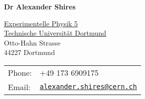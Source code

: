 \documentclass[10pt]{article}
\def\tud{Technische Universit\"at Dortmund}
\def\name{Dr Alexander Shires}
\providecommand*\email[1]{\href{mailto:#1}{#1}}
\renewcommand*\email[1]{\href{mailto:#1}{\texttt{#1}}}
\begin{document}
\centerline{\Large \bf \name}

\vspace{0.25cm}

\begin{minipage}{0.50\linewidth}
  \href{http://www.e5.physik.uni-dortmund.de}{Experimentelle Physik 5} \\
  \href{http://www.uni-dortmund.de}{\tud} \\
  Otto-Hahn Strasse \\
  44227 Dortmund 
\end{minipage}
\begin{minipage}{0.50\linewidth}
  \begin{tabular}{ll}
    Phone: & +49 173 6909175 \\
    Email: & \email{alexander.shires@cern.ch}\\
  \end{tabular}
\end{minipage}

\end{document}

